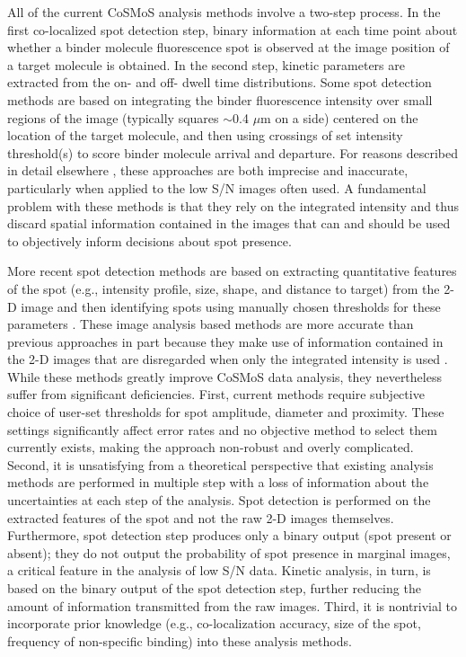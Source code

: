All of the current CoSMoS analysis methods involve a two-step process. In the first co-localized spot detection step, binary information at each time point about whether a binder molecule fluorescence spot is observed at the image position of a target molecule is obtained. In the second step, kinetic parameters are extracted from the on- and off- dwell time distributions. Some spot detection methods are based on integrating the binder fluorescence intensity over small regions of the image (typically squares $\sim$0.4 $\mu$m on a side) centered on the location of the target molecule, and then using crossings of set intensity threshold(s) to score binder molecule arrival and departure. For reasons described in detail elsewhere \citep{Friedman2015-nx}, these approaches are both imprecise and inaccurate, particularly when applied to the low S/N images often used. A fundamental problem with these methods is that they rely on the integrated intensity and thus discard spatial information contained in the images that can and should be used to objectively inform decisions about spot presence.

More recent spot detection methods are based on extracting quantitative features of the spot (e.g., intensity profile, size, shape, and distance to target) from the 2-D image and then identifying spots using manually chosen thresholds for these parameters \citep{Friedman2015-nx, Smith2019-yb}. These image analysis based methods are more accurate than previous approaches in part because they make use of information contained in the 2-D images that are disregarded when only the integrated intensity is used \citep{Friedman2015-nx}. While these methods greatly improve CoSMoS data analysis, they nevertheless suffer from significant deficiencies. First, current methods require subjective choice of user-set thresholds for spot amplitude, diameter and proximity. These settings significantly affect error rates and no objective method to select them currently exists, making the approach non-robust and overly complicated. Second, it is unsatisfying from a theoretical perspective that existing analysis methods are performed in multiple step with a loss of information about the uncertainties at each step of the analysis. Spot detection is performed on the extracted features of the spot and not the raw 2-D images themselves. Furthermore, spot detection step produces only a binary output (spot present or absent); they do not output the probability of spot presence in marginal images, a critical feature in the analysis of low S/N data. Kinetic analysis, in turn, is based on the binary output of the spot detection step, further reducing the amount of information transmitted from the raw images. Third, it is nontrivial to incorporate prior knowledge (e.g., co-localization accuracy, size of the spot, frequency of non-specific binding) into these analysis methods.

